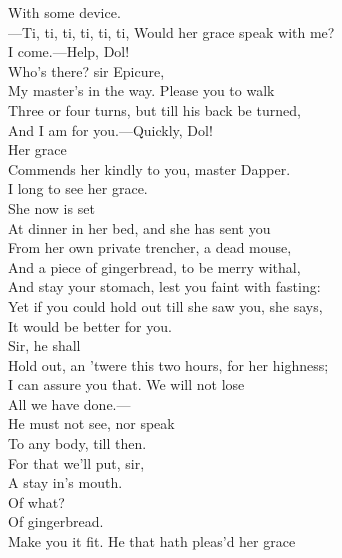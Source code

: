 \documentclass[a4paper,oneside]{memoir}
\begin{document}
\begin{drama*}
With some device.\\
 ---Ti, ti, ti, ti, ti, ti, Would her grace speak with me?\\
I come.---Help, Dol!\\
\facespeaks {}  Who's there? sir Epicure,\\
My master's in the way. Please you to walk\\
Three or four turns, but till his back be turned,\\
And I am for you.---Quickly, Dol!\\
\subtlespeaks {} Her grace\\
Commends her kindly to you, master Dapper.\\
\dapperspeaks I long to see her grace.\\
\subtlespeaks {} She now is set\\
At dinner in her bed, and she has sent you\\
From her own private trencher, a dead mouse,\\
And a piece of gingerbread, to be merry withal,\\
And stay your stomach, lest you faint with fasting:\\
Yet if you could hold out till she saw you, she says,\\
It would be better for you.\\
\facespeaks {} Sir, he shall\\
Hold out, an 'twere this two hours, for her highness;\\
I can assure you that. We will not lose\\
All we have done.---\\
\subtlespeaks {} He must not see, nor speak\\
To any body, till then.\\
\facespeaks {} For that we'll put, sir,\\
A stay in's mouth.\\
\subtlespeaks {} Of what?\\
\facespeaks {} Of gingerbread.\\
Make you it fit. He that hath pleas'd her grace\\

\end{drama*}
\end{document}
